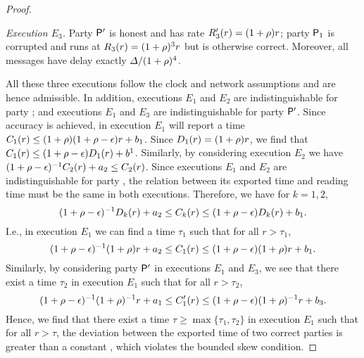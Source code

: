 \begin{proof}
\begin{cccItemize}[noitemsep]
        \item \emph{Execution $E_3$.}
        Party $\mathsf{P}'$ is honest and has rate $R'_3(r) = (1 + \rho) r$; party $\mathsf{P}_1$ is corrupted and runs at $R_3(r) = (1 + \rho)^3 r$ but is otherwise correct.
        Moreover, all messages have delay exactly $\varDelta / (1 + \rho)^4$.
    \end{cccItemize}
    All these three executions follow the clock and network assumptions and are hence admissible.
    In addition, executions $E_1$ and $E_2$ are indistinguishable for party \party; and executions $E_1$ and $E_3$ are indistinguishable for party $\mathsf{P}'$.
    Since accuracy is achieved, \party in execution $E_1$ will report a time $C_1(r) \le (1 + \rho)(1 + \rho - \epsilon) r + b_1$.
    Since $D_1(r) = (1 + \rho) r$, we find that $C_1(r) \le (1 + \rho - \epsilon) D_1(r) + b^1$.
    Similarly, by considering execution $E_2$ we have $(1 + \rho - \epsilon)^{-1} C_2(r) + a_2 \le C_2(r)$.
    Since executions $E_1$ and $E_2$ are indistinguishable for party \party, the relation between its exported time and reading time must be the same in both executions.
    Therefore, we have for $k = 1, 2$,
    \[ (1 + \rho - \epsilon)^{-1} D_k(r) + a_2 \le C_k(r) \le (1 + \rho - \epsilon) D_k(r) + b_1. \]
    I.e., in execution $E_1$ we can find a time $\tau_1$ such that for all $r > \tau_1$,
    \[ (1 + \rho - \epsilon)^{-1} (1 + \rho) r + a_2 \le C_1(r) \le (1 + \rho - \epsilon) (1 + \rho) r + b_1. \]
    Similarly, by considering party $\mathsf{P}'$ in executions $E_1$ and $E_3$, we see that there exist a time $\tau_2$ in execution $E_1$ such that for all $r > \tau_2$,
    \[ (1 + \rho - \epsilon)^{-1} (1 + \rho)^{-1} r + a_1 \le C'_1(r) \le (1 + \rho - \epsilon) (1 + \rho)^{-1} r + b_3. \]
    Hence, we find that there exist a time $\tau \ge \max \{ \tau_1, \tau_2 \}$ in execution $E_1$ such that for all $r > \tau$, the deviation between the exported time of two correct parties is greater than a constant \maxSkew, which violates the bounded skew condition.
\end{proof}
